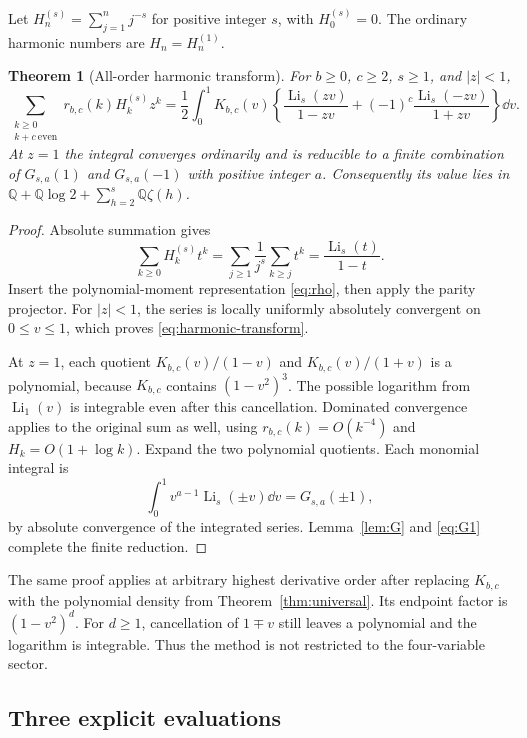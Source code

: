 \documentclass[11pt,letterpaper]{article}
\numberwithin{equation}{section}
\theoremstyle{plain}
\newtheorem{theorem}{Theorem}[section]
\theoremstyle{definition}
\theoremstyle{remark}
\newcommand{\Q}{\mathbb Q}\newcommand{\C}{\mathbb C}\newcommand{\N}{\mathbb N}
\DeclareMathOperator{\Li}{Li}\DeclareMathOperator{\FP}{FP}
\begin{document}
Let $H_n^{(s)}=\sum_{j=1}^n j^{-s}$ for positive integer $s$, with $H_0^{(s)}=0$. The ordinary harmonic numbers are $H_n=H_n^{(1)}$.

\begin{theorem}[All-order harmonic transform]\label{thm:harmonic}
For $b\ge0$, $c\ge2$, $s\ge1$, and $|z|<1$,
\begin{equation}\label{eq:harmonic-transform}
 \boxed{\displaystyle
 \sum_{\substack{k\ge0\\k+c\ \mathrm{even}}}
 r_{b,c}(k)H_k^{(s)}z^k
 =\frac12\int_0^1K_{b,c}(v)
 \left\{\frac{\Li_s(zv)}{1-zv}
       +(-1)^c\frac{\Li_s(-zv)}{1+zv}\right\}\dd v.}
\end{equation}
At $z=1$ the integral converges ordinarily and is reducible to a finite combination of $G_{s,a}(1)$ and $G_{s,a}(-1)$ with positive integer $a$. Consequently its value lies in
$\Q+\Q\log2+\sum_{h=2}^{s}\Q\zeta(h)$.
\end{theorem}

\begin{proof}
Absolute summation gives
\[
 \sum_{k\ge0}H_k^{(s)}t^k=
 \sum_{j\ge1}\frac1{j^s}\sum_{k\ge j}t^k
 =\frac{\Li_s(t)}{1-t}.
\]
Insert the polynomial-moment representation \eqref{eq:rho}, then apply the parity projector. For $|z|<1$, the series is locally uniformly absolutely convergent on $0\le v\le1$, which proves \eqref{eq:harmonic-transform}.

At $z=1$, each quotient $K_{b,c}(v)/(1-v)$ and $K_{b,c}(v)/(1+v)$ is a polynomial, because $K_{b,c}$ contains $(1-v^2)^3$. The possible logarithm from $\Li_1(v)$ is integrable even after this cancellation. Dominated convergence applies to the original sum as well, using $r_{b,c}(k)=O(k^{-4})$ and $H_k=O(1+\log k)$. Expand the two polynomial quotients. Each monomial integral is
\[
 \int_0^1v^{a-1}\Li_s(\pm v)\dd v=G_{s,a}(\pm1),
\]
by absolute convergence of the integrated series. Lemma~\ref{lem:G} and \eqref{eq:G1} complete the finite reduction.
\end{proof}

The same proof applies at arbitrary highest derivative order after replacing $K_{b,c}$ with the polynomial density from Theorem~\ref{thm:universal}. Its endpoint factor is $(1-v^2)^d$. For $d\ge1$, cancellation of $1\mp v$ still leaves a polynomial and the logarithm is integrable. Thus the method is not restricted to the four-variable sector.

\subsection{Three explicit evaluations}
\end{document}
